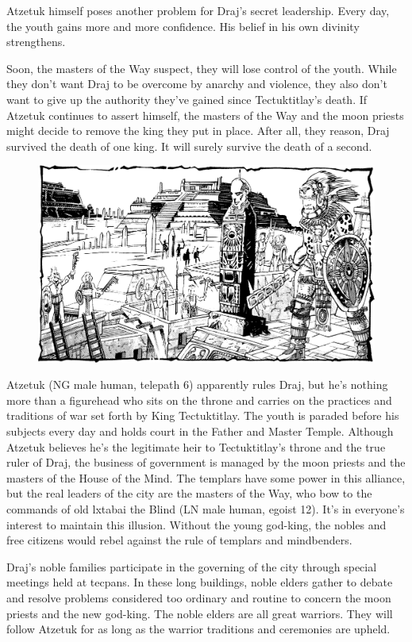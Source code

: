 {	Atzetuk himself poses another problem for Draj's secret leadership. Every day, the youth gains more and more confidence. His belief in his own divinity strengthens.

	Soon, the masters of the Way suspect, they will lose control of the youth. While they don't want Draj to be overcome by anarchy and violence, they also don't want to give up the authority they've gained since Tectuktitlay's death. If Atzetuk continues to assert himself, the masters of the Way and the moon priests might decide to remove the king they put in place. After all, they reason, Draj survived the death of one king. It will surely survive the death of a second.
}
{
\begin{figure}[b!]
\centering
\includegraphics[width=\textwidth]{images/draj-2.png}
\WOTC
\end{figure}

	Atzetuk (NG male human, telepath 6) apparently rules Draj, but he's nothing more than a figurehead who sits on the throne and carries on the practices and traditions of war set forth by King Tectuktitlay. The youth is paraded before his subjects every day and holds court in the Father and Master Temple. Although Atzetuk believes he's the legitimate heir to Tectuktitlay's throne and the true ruler of Draj, the business of government is managed by the moon priests and the masters of the House of the Mind. The templars have some power in this alliance, but the real leaders of the city are the masters of the Way, who bow to the commands of old lxtabai the Blind (LN male human, egoist 12). It's in everyone's interest to maintain this illusion. Without the young god-king, the nobles and free citizens would rebel against the rule of templars and mindbenders.

	Draj's noble families participate in the governing of the city through special meetings held at tecpans. In these long buildings, noble elders gather to debate and resolve problems considered too ordinary and routine to concern the moon priests and the new god-king. The noble elders are all great warriors. They will follow Atzetuk for as long as the warrior traditions and ceremonies are upheld.
}
